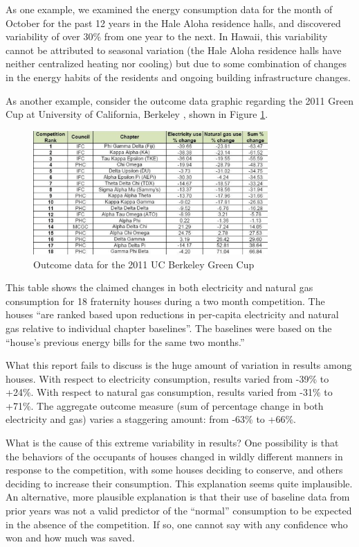 \documentclass[jou]{apa} %
\begin{document}
As one example, we examined the energy consumption data for the month of October for the
past 12 years in the Hale Aloha residence halls, and discovered variability of over 30\%
from one year to the next. In Hawaii, this variability cannot be attributed to seasonal
variation (the Hale Aloha residence halls have neither centralized heating nor cooling)
but due to some combination of changes in the energy habits of the residents and ongoing
building infrastructure changes.

As another example, consider the outcome data graphic regarding the 2011 Green Cup at University of
California, Berkeley \cite{Dhong2011}, shown in Figure \ref{fig:ucb-green-cup}.

\begin{figure}[htbp]
\begin{center}
\includegraphics[width=0.8\textwidth]{ucb-green-cup.png.eps}
\caption{Outcome data for the 2011 UC Berkeley Green Cup}
\label{fig:ucb-green-cup}
\end{center}
\end{figure}

This table shows the claimed changes in both electricity and natural gas consumption for
18 fraternity houses during a two month competition.  The houses ``are ranked based upon
reductions in per-capita electricity and natural gas relative to individual chapter
baselines''.  The baselines were based on the ``house's previous energy bills for the same
two months.''  

What this report fails to discuss is the huge amount of variation in results among
houses. With respect to electricity consumption, results varied from -39\% to +24\%.  With
respect to natural gas consumption, results varied from -31\% to +71\%.  The aggregate
outcome measure (sum of percentage change in both electricity and gas) varies a staggering
amount: from -63\% to +66\%.  

What is the cause of this extreme variability in results?  One possibility is that the behaviors
of the occupants of houses changed in wildly different manners in response to the
competition, with some houses deciding to conserve, and others deciding to increase
their consumption.  This explanation seems quite implausible.  An alternative, more plausible
explanation is that their use of baseline data from prior years was not a valid predictor of
the ``normal'' consumption to be expected in the absence of the competition. If so, one
cannot say with any confidence who won and how much was saved. 
\end{document}
